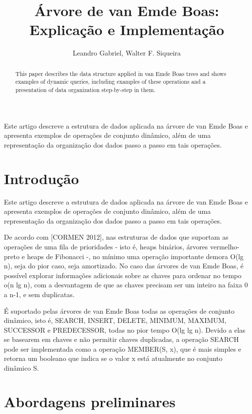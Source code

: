 \documentclass[12pt]{article}
\title{Árvore de van Emde Boas: Explicação e Implementação}
\author{Leandro Gabriel, Walter F. Siqueira}
\begin{document}
 

\maketitle

\begin{abstract}
  This paper describes the data structure applied in van Emde Boas trees and shows examples of dynamic queries, including examples of these operations and a presentation of data organization step-by-step in them.
\end{abstract}
     
\begin{resumo} 
  Este artigo descreve a estrutura de dados aplicada na árvore de van Emde Boas e apresenta exemplos de operações de conjunto dinâmico, além de uma representação da organização dos dados passo a passo em tais operações.
\end{resumo}


\section{Introdução} \label{sec:intro}

Este artigo descreve a estrutura de dados aplicada na árvore de van Emde Boas e apresenta exemplos de operações de conjunto dinâmico, além de uma representação da organização dos dados passo a passo em tais operações.

De acordo com [CORMEN 2012], nas estruturas de dados que suportam as operações de uma fila de prioridades - isto é, heaps binários, árvores vermelho-preto e heaps de Fibonacci -, no mínimo uma operação importante demora O(lg n), seja do pior caso, seja amortizado. No caso das árvores de van Emde Boas, é possível explorar informações adicionais sobre as chaves para ordenar no tempo o(n lg n), com a desvantagem de que as chaves precisam ser um inteiro na faixa 0 a n-1, e sem duplicatas.

É suportado pelas árvores de van Emde Boas todas as operações de conjunto dinâmico, isto é, SEARCH, INSERT, DELETE, MINIMUM, MAXIMUM, SUCCESSOR e PREDECESSOR, todas no pior tempo O(lg lg n). Devido a elas se basearem em chaves e não permitir chaves duplicadas, a operação SEARCH pode ser implementada como a operação MEMBER(S, x), que é mais simples e retorna um booleano que indica se o valor x está atualmente no conjunto dinâmico S.

\section{Abordagens preliminares} \label{sec:abordagensPreliminares}
\end{document}
